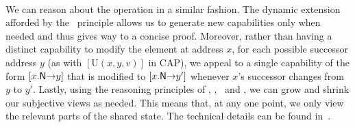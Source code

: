 {\\}
%
%
We can reason about the  operation in a similar
fashion. The dynamic extension afforded by the \extendRule\ principle
allows us to generate new capabilities only when needed and thus gives
way to a concise proof. 
%
Moreover, rather than having a distinct capability to modify the element at address $x$, for each possible successor address $y$ (as with $[\text{U}(x, y, v)]$ in CAP), we appeal to a single capability of the form $[\nextC{x}{y}]$ that is modified to $[\nextC{x}{y'}]$ whenever $x$'s successor changes from $y$ to $y'$.
%
Lastly, using the reasoning principles of \mergeRule, \forgetRule,
\shiftRule\ and \copyRule, we can grow and shrink our subjective views
as needed. This means that,  at any one point, we only view the relevant parts of the shared state. 
%
The technical details can be found in~\cite{colosl-tr14}. \\
